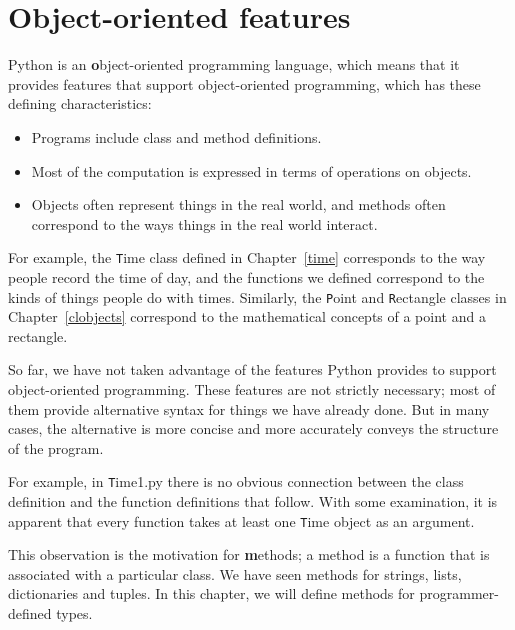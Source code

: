 \documentclass[
DIV=11,
fontsize=12,
twoside,
headinclude=false,
titlepage=firstiscover,
abstract=true,
headsepline=true,
footsepline=true,
chapterprefix=true, %
headings=big,
bibliography=totoc,%
captions=tableheading
]{scrbook}
\theoremstyle{definition}
\begin{document}
\section{Object-oriented features}

Python is an {\textbf object-oriented programming language}, which means
that it provides features that support object-oriented
programming, which has these defining characteristics:

\begin{itemize}

\item Programs include class and method definitions.

\item Most of the computation is expressed in terms of operations on
  objects.

\item Objects often represent things
in the real world, and methods often
correspond to the ways things in the real world interact.

\end{itemize}

For example, the {\texttt Time} class defined in Chapter~\ref{time}
corresponds to the way people record the time of day, and the
functions we defined correspond to the kinds of things people do with
times.  Similarly, the {\texttt Point} and {\texttt Rectangle} classes
in Chapter~\ref{clobjects}
correspond to the mathematical concepts of a point and a rectangle.

So far, we have not taken advantage of the features Python provides to
support object-oriented programming.  These
features are not strictly necessary; most of them provide
alternative syntax for things we have already done.  But in many cases,
the alternative is more concise and more accurately conveys the
structure of the program.

For example, in {\texttt Time1.py} there is no obvious
connection between the class definition and the function definitions
that follow.  With some examination, it is apparent that every function
takes at least one {\texttt Time} object as an argument.

This observation is the motivation for {\textbf methods}; a method is
a function that is associated with a particular class.
We have seen methods for strings, lists, dictionaries and tuples.
In this chapter, we will define methods for programmer-defined types.
\end{document}
